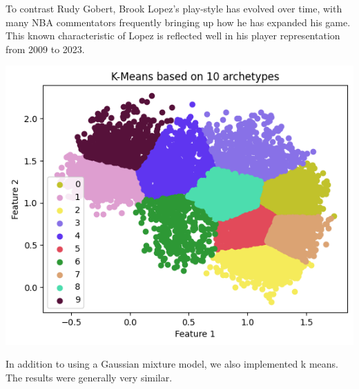 \documentclass[12pt, letterpaper, titlepage]{article}
\begin{document}
To contrast Rudy Gobert, Brook Lopez's play-style has evolved over time, with many NBA commentators frequently bringing up how he has expanded his game.  This known characteristic of Lopez is reflected well in his player representation from 2009 to 2023.

\includegraphics{kmeans}

In addition to using a Gaussian mixture model, we also implemented k means.  The results were generally very similar.
\end{document}
